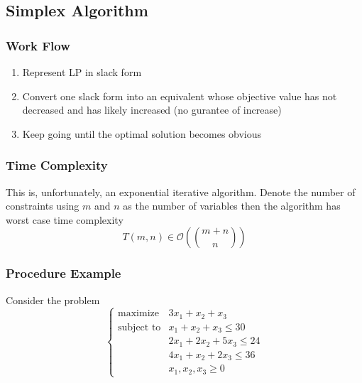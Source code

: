 \documentclass[10pt]{article}
\begin{document}
\subsection{Simplex Algorithm}

\subsubsection{Work Flow}
\begin{enumerate}
    \item Represent LP in slack form
    \item Convert one slack form into an equivalent whose objective value has not decreased and has likely increased (no gurantee of increase)
    \item Keep going until the optimal solution becomes obvious
\end{enumerate}

\subsubsection{Time Complexity} This is, unfortunately, an exponential iterative algorithm. Denote the number of constraints using $m$ and $n$ as the number of variables then the algorithm has worst case time complexity 
\begin{equation*}
    T(m,n) \in \mathcal{O}\left(\binom{m+n}{n}\right)
\end{equation*}

\subsubsection{Procedure Example}
Consider the problem
$$
\begin{cases}
    \text{maximize} & 3x_1 + x_2 + x_3 \\
    \text{subject to} &x_1 + x_2 + x_3 \leq 30 \\
    &2x_1 + 2x_2 + 5x_3 \leq 24 \\
    &4x_1 + x_2 + 2x_3 \leq 36 \\
    &x_1,x_2,x_3\geq 0
\end{cases}
$$
\end{document}
